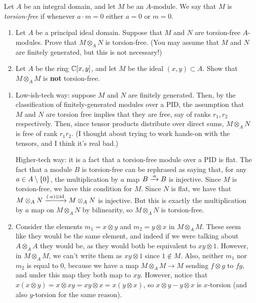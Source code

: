 \begin{question}[subtitle = From a Michigan qual]
Let $A$ be an integral domain, and let $M$ be an $A$-module. We say that $M$ is \emph{torsion-free} if whenever $a\cdot m = 0$ either $a = 0$ or $m = 0$.
\begin{enumerate}
    \item Let $A$ be a principal ideal domain. Suppose that $M$ and $N$ are torsion-free $A$-modules. Prove that $M \otimes_A N$ is torsion-free. (You may assume that $M$ and $N$ are finitely generated, but this is not necessary!)
    \item Let $A$ be the ring $\mathbb{C}[x,y]$, and let $M$ be the ideal $(x,y) \subset A$. Show that $M \otimes_A M$ is \textbf{not} torsion-free.
\end{enumerate}
\end{question}
\begin{solution}
\begin{enumerate}
    \item Low-ish-tech way: suppose $M$ and $N$ are finitely generated. Then, by the classification of finitely-generated modules over a PID, the assumption that $M$ and $N$ are torsion free implies that they are free, say of ranks $r_1,r_2$ respectively. Then, since tensor products distribute over direct sums, $M \otimes_A N$ is free of rank $r_1 r_2$. (I thought about trying to work hands-on with the tensors, and I think it's real bad.)

    Higher-tech way: it is a fact that a torsion-free module over a PID is flat. The fact that a module $B$ is torsion-free can be rephrased as saying that, for any $a \in A \setminus\{0\}$, the multiplication by $a$ map $B \xrightarrow{\cdot a} B$ is injective. Since $M$ is torsion-free, we have this condition for $M$. Since $N$ is flat, we have that $M \otimes_A N \xrightarrow{(\cdot a)\otimes \text{id}} M \otimes_A N$ is injective. But this is exactly the multiplication by $a$ map on $M \otimes_A N$ by bilinearity, so $M \otimes_A N$ is torsion-free.

    \item Consider the elements $m_1 = x \otimes y$ and $m_2 = y \otimes x$ in $M \otimes_A M$. These seem like they would be the same element, and indeed if we were talking about $A \otimes_A A$ they would be, as they would both be equivalent to $xy \otimes 1$. However, in $M \otimes_A M$, we can't write them as $xy \otimes 1$ since $1 \notin M$. Also, neither $m_1$ nor $m_2$ is equal to 0, because we have a map $M \otimes_A M \to M$ sending $f \otimes g$ to $fg$, and under this map they both map to $xy$. However, notice that $x(x\otimes y) = x \otimes xy = xy \otimes x = x(y \otimes x)$, so $x \otimes y - y \otimes x$ is $x$-torsion (and also $y$-torsion for the same reason).


\end{enumerate}
\end{solution}
